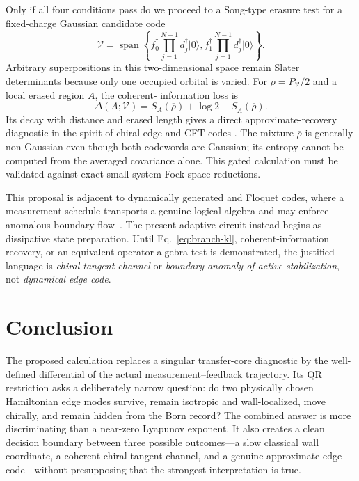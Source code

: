 \documentclass[aps,prb,onecolumn,nofootinbib,superscriptaddress]{revtex4-2}
\newcommand{\cV}{\mathcal{V}}
\newcommand{\ket}[1]{\lvert #1\rangle}
\begin{document}
Only if all four conditions pass do we proceed to a Song-type erasure test for
a fixed-charge Gaussian candidate code
\begin{equation}
 \cV=\operatorname{span}\left\{
 f_0^\dagger\prod_{j=1}^{N-1}d_j^\dagger\ket{0},
 f_1^\dagger\prod_{j=1}^{N-1}d_j^\dagger\ket{0}
 \right\}.
 \label{eq:gaussian-code}
\end{equation}
Arbitrary superpositions in this two-dimensional space remain Slater
determinants because only one occupied orbital is varied.  For
$\overline\rho=P_{\cV}/2$ and a local erased region $A$, the coherent-
information loss is
\begin{equation}
 \Delta(A;\cV)=S_A(\overline\rho)+\log 2-S_{\bar A}(\overline\rho).
 \label{eq:song-loss}
\end{equation}
Its decay with distance and erased length gives a direct approximate-recovery
diagnostic in the spirit of chiral-edge and CFT codes
\cite{SongEtAl2026,SangHsiehZou2024}.  The mixture $\overline\rho$ is generally
non-Gaussian even though both codewords are Gaussian; its entropy cannot be
computed from the averaged covariance alone.  This gated calculation must be
validated against exact small-system Fock-space reductions.

This proposal is adjacent to dynamically generated and Floquet codes, where a
measurement schedule transports a genuine logical algebra and may enforce
anomalous boundary flow~\cite{HastingsHaah2021,AasenHaahLiMong2023}.  The
present adaptive circuit instead begins as dissipative state preparation.
Until Eq.~\eqref{eq:branch-kl}, coherent-information recovery, or an equivalent
operator-algebra test is demonstrated, the justified language is \emph{chiral
tangent channel} or \emph{boundary anomaly of active stabilization}, not
\emph{dynamical edge code}.

\section{Conclusion}

The proposed calculation replaces a singular transfer-core diagnostic by the
well-defined differential of the actual measurement--feedback trajectory.
Its QR restriction asks a deliberately narrow question: do two physically
chosen Hamiltonian edge modes survive, remain isotropic and wall-localized,
move chirally, and remain hidden from the Born record?  The combined answer is
more discriminating than a near-zero Lyapunov exponent.  It also creates a
clean decision boundary between three possible outcomes---a slow classical
wall coordinate, a coherent chiral tangent channel, and a genuine approximate
edge code---without presupposing that the strongest interpretation is true.



\end{document}

